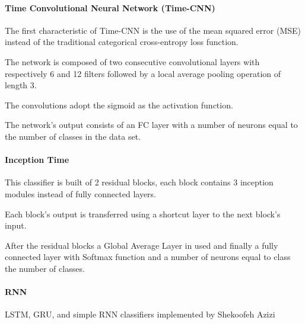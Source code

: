 \documentclass[conference]{IEEEtran}
\begin{document}
\paragraph{Time Convolutional Neural Network (Time-CNN)}
The first characteristic of Time-CNN \cite{Zhao2017} is the use of the mean squared error (MSE) instead of the traditional categorical cross-entropy loss function. 

The network is composed of two consecutive convolutional layers with respectively 6 and 12 filters followed by a local average pooling operation of length 3. 

The convolutions adopt the sigmoid as the activation function. 

The network’s output consists of an FC layer with a number of neurons equal to the number of classes in the data set.

\paragraph{Inception Time}
This classifier \cite{Fawaz2020} is built of 2 residual blocks, each block contains 3 inception modules instead of fully connected layers. 

Each block's output is transferred using a shortcut layer to the next block's input. 

After the residual blocks a Global Average Layer in used and finally a fully connected layer with Softmax function and a number of neurons equal to class the number of classes.
\paragraph{RNN}
LSTM, GRU, and simple RNN classifiers implemented by Shekoofeh Azizi\cite{azizi2018deep}
\end{document}
